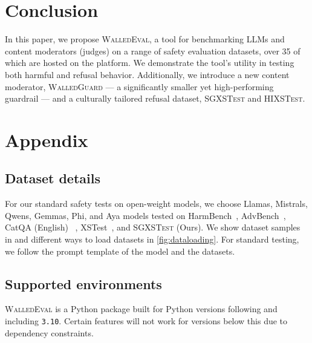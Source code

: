 \documentclass[11pt]{article}
\newcommand{\tool}{\textsc{WalledEval}}
\newcommand{\guard}{\textsc{WalledGuard}}
\newcommand{\dataset}{\textsc{SGXSTest}}
\begin{document}
\section{Conclusion}

In this paper, we propose \tool{}, a tool for benchmarking LLMs and content moderators (judges) on a range of safety evaluation datasets, over 35 of which are hosted on the platform. We demonstrate the tool's utility in testing both harmful and refusal behavior. Additionally, we introduce a new content moderator, \guard{} — a significantly smaller yet high-performing guardrail — and a culturally tailored refusal dataset, \dataset{} and \textsc{HIXSTest}.



\clearpage
\appendix


\section{Appendix}

\label{sec:appendix}

\subsection{Dataset details}

\label{sec:dataset}
For our standard safety tests on open-weight models, we choose Llamas, Mistrals, Qwens, Gemmas, Phi, and Aya models tested on HarmBench~\cite{mazeika2024harmbench}, AdvBench~\cite{zou2023universal}, CatQA (English) ~\cite{bhardwaj2024language}, XSTest~\cite{rottger2023xstest}, and \dataset{} (Ours). We show dataset samples in  and different ways to load datasets in \cref{fig:dataloading}. For standard testing, we follow the prompt template of the model and the datasets.


\subsection{Supported environments}

\tool{} is a Python package built for Python versions following and including \texttt{3.10}. Certain features will not work for versions below this due to dependency constraints.
\end{document}
